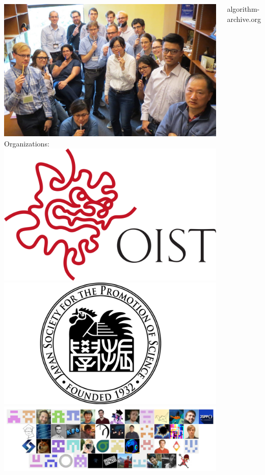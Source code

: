 \documentclass{beamer}
\begin{document}
\begin{frame}
\begin{columns}
\includegraphics[width=\textwidth]{unit.JPG}
Organizations:
\includegraphics[width=\textwidth]{OIST.png}
\includegraphics[width=\textwidth]{JSPS.png}
\includegraphics[width=\textwidth]{AAA.png}
\begin{center}
{\small algorithm-archive.org}
\end{center}
\end{columns}
\end{frame}
\end{document}
